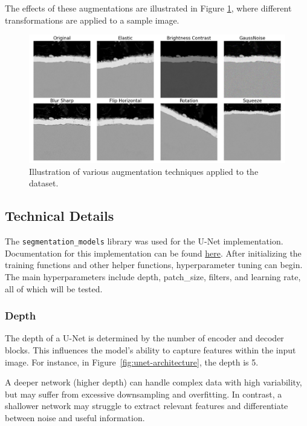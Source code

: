 The effects of these augmentations are illustrated in Figure \ref{fig:augmentation}, where different transformations are applied to a sample image.

\begin{figure}[H]
\centering
\includegraphics[width=1\linewidth]{PICTURES/augumentation.png}
\caption{Illustration of various augmentation techniques applied to the dataset.}
\label{fig:augmentation}
\end{figure}

\subsection{Technical Details}
The \texttt{segmentation\_models} library \cite{Iakubovskii:2019} was used for the U-Net implementation. Documentation for this implementation can be found \href{https://smp.readthedocs.io/en/latest/models.html#id22}{here}\cite{SegmentationModelsPyTorch}. After initializing the training functions and other helper functions, hyperparameter tuning can begin. The main hyperparameters include depth, patch\_size, filters, and learning rate, all of which will be tested.

\subsubsection{Depth}
The depth of a U-Net is determined by the number of encoder and decoder blocks. This influences the model's ability to capture features within the input image. For instance, in Figure~\ref{fig:unet-architecture}, the depth is 5.

A deeper network (higher depth) can handle complex data with high variability, but may suffer from excessive downsampling and overfitting. In contrast, a shallower network may struggle to extract relevant features and differentiate between noise and useful information.

